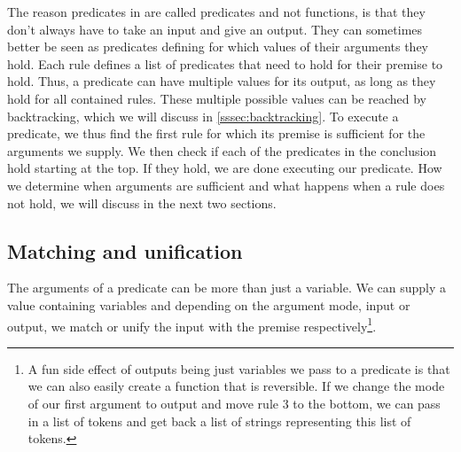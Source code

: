 \documentclass[thesis.tex]{subfiles}
\begin{document}
{{The reason predicates in \elpi are called predicates and not functions, is that they don't always have to take an input and give an output. They can sometimes better be seen as predicates defining for which values of their arguments they hold. Each rule defines a list of predicates that need to hold for their premise to hold. Thus, a predicate can have multiple values for its output, as long as they hold for all contained rules. These multiple possible values can be reached by backtracking, which we will discuss in \cref{sssec:backtracking}. To execute a predicate, we thus find the first rule for which its premise is sufficient for the arguments we supply. We then check if each of the predicates in the conclusion hold starting at the top. If they hold, we are done executing our predicate. How we determine when arguments are sufficient and what happens when a rule does not hold, we will discuss in the next two sections.

\subsection{Matching and unification}\label{sssec:mandu}
The arguments of a predicate can be more than just a variable. We can supply a value containing variables and depending on the argument mode, input or output, we match or unify the input with the premise respectively\footnote{A fun side effect of outputs being just variables we pass to a predicate is that we can also easily create a function that is reversible. If we change the mode of our first argument to output and move rule 3 to the bottom, we can pass in a list of tokens and get back a list of strings representing this list of tokens.}.

}}
\end{document}
